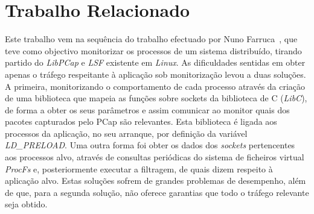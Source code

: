 \documentclass[a4paper]{llncs}
\providecommand{\e}[1]{\ensuremath{\times 10^{#1}}}
\begin{document}
%
%
%

\section{Trabalho Relacionado}
\label{sec:related_work}


Este trabalho vem na sequência do trabalho efectuado por Nuno Farruca~\cite{Farruca:2009,duarte10}, que teve como objectivo monitorizar os processos de um sistema distribuído, tirando partido do \textit{LibPCap} e \textit{LSF} existente em \textit{Linux}.
 As dificuldades sentidas em obter apenas o tráfego respeitante à aplicação sob monitorização levou a duas soluções.
 A primeira, monitorizando o comportamento de cada processo através da criação de uma biblioteca que mapeia as funções sobre sockets da biblioteca de C (\textit{LibC}), de forma a obter os seus parâmetros e assim comunicar ao monitor quais dos pacotes capturados pelo PCap são relevantes.
 Esta biblioteca é ligada aos processos da aplicação, no seu arranque, por definição da variável \textit{LD\_PRELOAD}.
 Uma outra forma foi obter os dados dos \textit{sockets} pertencentes aos processos alvo, através de consultas periódicas do sistema de ficheiros virtual \textit{ProcFs} e, posteriormente executar a filtragem, de quais dizem respeito à aplicação alvo.
 Estas soluções sofrem de grandes problemas de desempenho, além de que, para a segunda solução, não oferece garantias que todo o tráfego relevante seja obtido.
\end{document}
